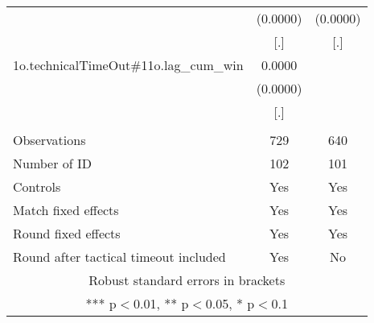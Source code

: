 \documentclass[]{article}
\begin{document}
\begin{tabular}{lcc}
 & (0.0000) & (0.0000) \\
 & [.] & [.] \\
1o.technicalTimeOut\#11o.lag\_cum\_win & 0.0000 &  \\
 & (0.0000) &  \\
 & [.] &  \\
 &  &  \\
Observations & 729 & 640 \\
Number of ID & 102 & 101 \\
Controls & Yes & Yes \\
Match fixed effects & Yes & Yes \\
Round fixed effects & Yes & Yes \\
 Round after tactical timeout included & Yes & No \\ \hline
\multicolumn{3}{c}{ Robust standard errors in brackets} \\
\multicolumn{3}{c}{ *** p$<$0.01, ** p$<$0.05, * p$<$0.1} \\
\end{tabular}
\end{document}
